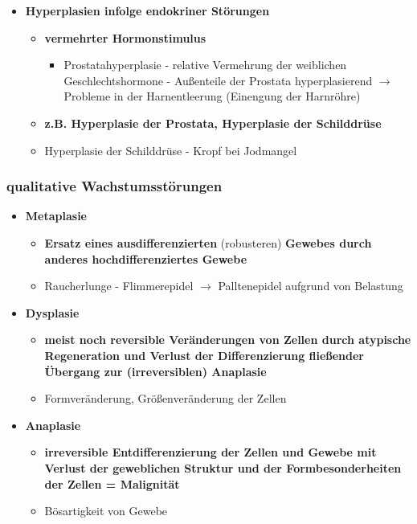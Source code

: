 \begin{itemize}
\begin{itemize}
\begin{itemize}
\begin{itemize}
							\end{itemize}
					\end{itemize}
				\item \textbf{Hyperplasien infolge endokriner Störungen}
					\begin{itemize}
						\item \textbf{vermehrter Hormonstimulus}
							\begin{itemize}
								\item Prostatahyperplasie - relative Vermehrung der weiblichen Geschlechtshormone - Außenteile der Prostata hyperplasierend $\rightarrow$ Probleme in der Harnentleerung (Einengung der Harnröhre)
							\end{itemize}
						\item \textbf{z.B. Hyperplasie der Prostata, Hyperplasie der Schilddrüse}
						\item Hyperplasie der Schilddrüse - Kropf bei Jodmangel 
					\end{itemize}
			\end{itemize}
	\end{itemize}

\subsubsection{qualitative Wachstumsstörungen}
	\begin{itemize}
		\item \textbf{Metaplasie}
			\begin{itemize}
				\item \textbf{Ersatz eines ausdifferenzierten} (robusteren) \textbf{Gewebes durch anderes hochdifferenziertes Gewebe}
				\item Raucherlunge - Flimmerepidel $\rightarrow$ Palltenepidel aufgrund von Belastung 
			\end{itemize}
		\item \textbf{Dysplasie}
			\begin{itemize}
				\item \textbf{meist noch reversible Veränderungen von Zellen durch atypische Regeneration und Verlust der Differenzierung fließender Übergang zur (irreversiblen) Anaplasie}
				\item Formveränderung, Größenveränderung der Zellen
			\end{itemize}
		\item \textbf{Anaplasie}
			\begin{itemize}
				\item \textbf{irreversible Entdifferenzierung der Zellen und Gewebe mit Verlust der geweblichen Struktur und der Formbesonderheiten der Zellen = Malignität}
				\item Bösartigkeit von Gewebe
			\end{itemize}
	\end{itemize}